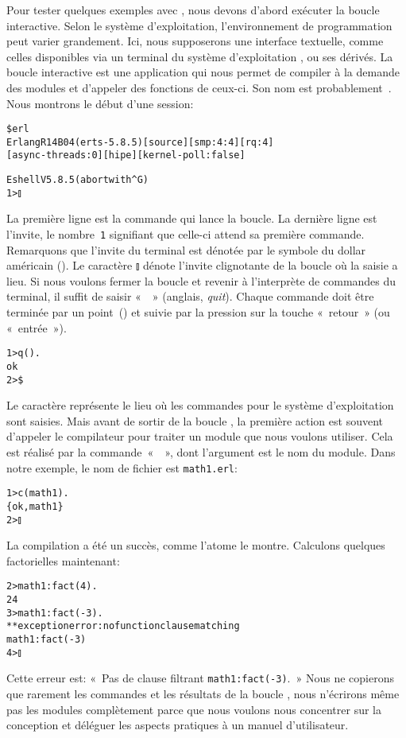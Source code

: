 Pour tester quelques exemples avec , nous devons
d'abord exécuter la boucle interactive. Selon le système
d'exploitation, l'environnement de programmation peut varier
grandement. Ici, nous supposerons une interface textuelle, comme
celles disponibles via un terminal du système d'exploitation \Unix, ou
ses dérivés. La boucle interactive \Erlang est une application qui
nous permet de compiler à la demande des modules et d'appeler des
fonctions de ceux-ci. Son nom est probablement~. Nous
montrons le début d'une session:
\begin{alltt}
\$ erl
Erlang R14B04 (erts-5.8.5) [source] [smp:4:4] [rq:4]
[async-threads:0] [hipe] [kernel-poll:false]

Eshell V5.8.5  (abort with ^G)
1> \(\talloblong\)
\end{alltt}
La première ligne est la commande qui lance la boucle. La dernière
ligne est l'invite, le nombre~\texttt{1} signifiant que celle-ci
attend sa première commande. Remarquons que l'invite du terminal est
dénotée par le symbole du dollar américain (\erlcode{\$}). Le
caractère \(\talloblong\) dénote l'invite clignotante de la boucle
\Erlang où la saisie a lieu. Si nous voulons fermer la boucle et
revenir à l'interprète de commandes du terminal, il suffit de saisir
«~~» (anglais, \emph{quit}). Chaque commande doit être
terminée par un point~() et suivie par la pression sur la
touche «~retour~» (ou «~entrée~»).
\begin{alltt}
1> q().
ok
2> \$ \textvisiblespace
\end{alltt}
Le caractère \erlcode{\textvisiblespace} représente le lieu où les
commandes pour le système d'exploitation sont saisies. Mais avant de
sortir de la boucle \Erlang, la première action est souvent d'appeler
le compilateur \Erlang pour traiter un module que nous voulons
utiliser. Cela est réalisé par la commande~«~~», dont
l'argument est le nom du module. Dans notre exemple, le nom de fichier
est \texttt{math1.erl}:
\begin{alltt}
1> c(math1).
\{ok,math1\}
2> \(\talloblong\)
\end{alltt}
La compilation a été un succès, comme l'atome  le
montre. Calculons quelques factorielles maintenant:
\begin{alltt}
2> math1:fact(4).
24
3> math1:fact(-3).
** exception error: no function clause matching
math1:fact(-3)
4> \(\talloblong\)
\end{alltt}
Cette erreur est: «~Pas de clause filtrant \texttt{math1:fact(-3)}.~»
Nous ne copierons que rarement les commandes et les résultats de la
boucle \Erlang, nous n'écrirons même pas les modules complètement
parce que nous voulons nous concentrer sur la conception et déléguer
les aspects pratiques à un manuel d'utilisateur.

